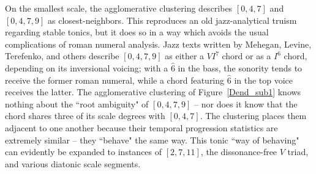 On the smallest scale, the agglomerative clustering describes $[0,4,7]$ and $[0,4,7,9]$ as closest-neighbors.  This reproduces an old jazz-analytical truism regarding stable tonics, but it does so in a way which avoids the usual complications of roman numeral analysis.  Jazz texts written by Mehegan, Levine, Terefenko, and others describe $[0,4,7,9]$ as either a $VI^7$ chord or as a $I^6$ chord, depending on its inversional voicing; with a $\hat{6}$ in the bass, the sonority tends to receive the former roman numeral, while a chord featuring $\hat{6}$ in the top voice receives the latter.  The agglomerative clustering of Figure~\ref{Dend_sub1} knows nothing about the ``root ambiguity" of $[0,4,7,9]$ -- nor does it know that the chord shares three of its scale degrees with $[0,4,7]$.  The clustering places them adjacent to one another because their temporal progression statistics are extremely similar -- they ``behave" the same way.  This tonic ``way of behaving" can evidently be expanded to instances of $[2,7,11]$, the dissonance-free $V$ triad, and various diatonic scale segments. 

